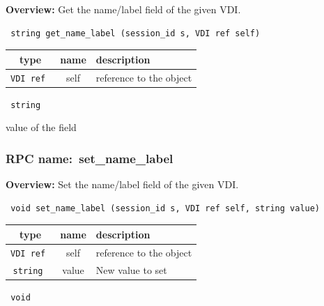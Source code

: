{\bf Overview:} 
Get the name/label field of the given VDI.

\begin{verbatim} string get_name_label (session_id s, VDI ref self)\end{verbatim}



 
\vspace{0.3cm}
\begin{tabular}{|c|c|p{7cm}|}
 \hline
{\bf type} & {\bf name} & {\bf description} \\ \hline
{\tt VDI ref } & self & reference to the object \\ \hline 

\end{tabular}

\vspace{0.3cm}

{\tt 
string
}


value of the field
\vspace{0.3cm}
\vspace{0.3cm}
\vspace{0.3cm}
\subsubsection{RPC name:~set\_name\_label}

{\bf Overview:} 
Set the name/label field of the given VDI.

\begin{verbatim} void set_name_label (session_id s, VDI ref self, string value)\end{verbatim}



 
\vspace{0.3cm}
\begin{tabular}{|c|c|p{7cm}|}
 \hline
{\bf type} & {\bf name} & {\bf description} \\ \hline
{\tt VDI ref } & self & reference to the object \\ \hline 

{\tt string } & value & New value to set \\ \hline 

\end{tabular}

\vspace{0.3cm}

{\tt 
void
}



